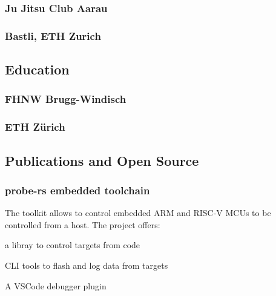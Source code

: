 \begin{timeline}
    \subsubsection{Ju Jitsu Club Aarau}
    \sectionsep

    \subsubsection{Bastli, ETH Zurich}
    \sectionsep

    
    \subsection{Education}
    
    \subsubsection{FHNW Brugg-Windisch}
    \sectionsep
    
    \subsubsection{ETH Zürich}
    \sectionsep
    
    
    \subsection{Publications and Open Source}

    \subsubsection{probe-rs embedded toolchain}
    The toolkit allows to control embedded ARM and RISC-V MCUs to be controlled from a host.
    The project offers:\\
    \begin{tightemize}
    \item a libray to control targets from code
    \item CLI tools to flash and log data from targets
    \item A VSCode debugger plugin
    \end{tightemize}
    \sectionsep
    

\end{timeline}
